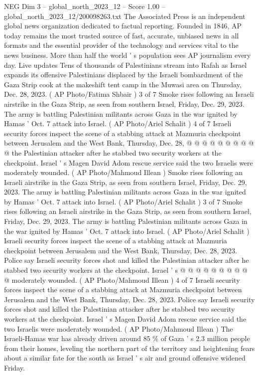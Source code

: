 \begin{textsample}{NEG Dim 3 – global\_north\_2023\_12 – Score 1.00 – global\_north\_2023\_12/200098263.txt}  \label{ex:f3_neg_192}
The Associated Press is an independent global news organization dedicated to factual reporting.
Founded in 1846, AP today remains the most trusted source of fast, accurate, unbiased news in all formats and the essential provider of the technology and services vital to the news business.
More than half the world ' s population sees AP journalism every day.
Live updates Tens of thousands of Palestinians stream into Rafah as Israel expands its offensive Palestinians displaced by the Israeli bombardment of the Gaza Strip cook at the makeshift tent camp in the Muwasi area on Thursday, Dec. 28, 2023. ( AP Photo/Fatima Shbair ) 3 of 7 Smoke rises following an Israeli airstrike in the Gaza Strip, as seen from southern Israel, Friday, Dec. 29, 2023.
The army is battling Palestinian militants across Gaza in the war ignited by Hamas ' Oct. 7 attack into Israel. ( AP Photo/Ariel Schalit ) 4 of 7 Israeli security forces inspect the scene of a stabbing attack at Mazmuria checkpoint between Jerusalem and the West Bank, Thursday, Dec. 28, @ @ @ @ @ @ @ @ @ @ the Palestinian attacker after he stabbed two security workers at the checkpoint.
Israel ' s Magen David Adom rescue service said the two Israelis were moderately wounded. ( AP Photo/Mahmoud Illean ) Smoke rises following an Israeli airstrike in the Gaza Strip, as seen from southern Israel, Friday, Dec. 29, 2023.
The army is battling Palestinian militants across Gaza in the war ignited by Hamas ' Oct. 7 attack into Israel. ( AP Photo/Ariel Schalit ) 3 of 7 Smoke rises following an Israeli airstrike in the Gaza Strip, as seen from southern Israel, Friday, Dec. 29, 2023.
The army is battling Palestinian militants across Gaza in the war ignited by Hamas ' Oct. 7 attack into Israel. ( AP Photo/Ariel Schalit ) Israeli security forces inspect the scene of a stabbing attack at Mazmuria checkpoint between Jerusalem and the West Bank, Thursday, Dec. 28, 2023.
Police say Israeli security forces shot and killed the Palestinian attacker after he stabbed two security workers at the checkpoint.
Israel ' s @ @ @ @ @ @ @ @ @ @ moderately wounded. ( AP Photo/Mahmoud Illean ) 4 of 7 Israeli security forces inspect the scene of a stabbing attack at Mazmuria checkpoint between Jerusalem and the West Bank, Thursday, Dec. 28, 2023.
Police say Israeli security forces shot and killed the Palestinian attacker after he stabbed two security workers at the checkpoint.
Israel ' s Magen David Adom rescue service said the two Israelis were moderately wounded. ( AP Photo/Mahmoud Illean ) The Israeli-Hamas war has already driven around 85 \% of Gaza ' s 2.3 million people from their homes, leveling the northern part of the territory and heightening fears about a similar fate for the south as Israel ' s air and ground offensive widened Friday.

\end{textsample}
